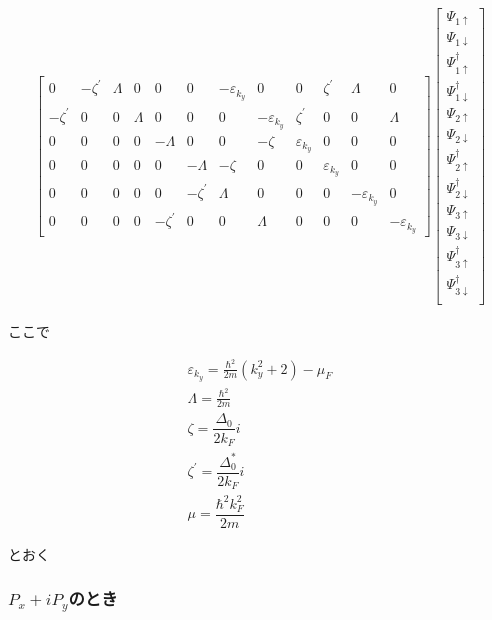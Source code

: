 \documentclass{jsarticle}
\begin{document}
\begin{align}
\begin{bmatrix}
			    	0 & -\zeta^{'} & \varLambda & 0 & 0 & 0 & -\varepsilon_{k_y} & 0 & 0 & \zeta^{'} & \varLambda & 0 \\
			    	-\zeta^{'} & 0 & 0 & \varLambda & 0 & 0 & 0 & -\varepsilon_{k_y} & \zeta^{'} & 0 & 0 & \varLambda \\
			    	0 & 0 & 0 & 0 & -\varLambda & 0 & 0 & -\zeta & \varepsilon_{k_y} & 0 & 0 & 0 \\
			    	0 & 0 & 0 & 0 & 0 & -\varLambda & -\zeta & 0 & 0 & \varepsilon_{k_y} & 0 & 0 \\
			    	0 & 0 & 0 & 0 & 0 & -\zeta^{'} & \varLambda & 0 & 0 & 0 & -\varepsilon_{k_y} & 0 \\
			    	0 & 0 & 0 & 0 & -\zeta^{'} & 0 & 0 & \varLambda & 0 & 0 & 0 & -\varepsilon_{k_y}
			    \end{bmatrix}
			    \begin{bmatrix}
			    	\Psi_{1\uparrow} \\
			    	\Psi_{1\downarrow} \\
			    	\Psi_{1\uparrow}^\dagger \\
			    	\Psi_{1\downarrow}^\dagger \\
			    	\Psi_{2\uparrow} \\
			    	\Psi_{2\downarrow} \\
			    	\Psi_{2\uparrow}^\dagger \\
			    	\Psi_{2\downarrow}^\dagger \\
			    	\Psi_{3\uparrow} \\
			    	\Psi_{3\downarrow} \\
			    	\Psi_{3\uparrow}^\dagger \\
			    	\Psi_{3\downarrow}^\dagger \\
			    \end{bmatrix}
		    \end{align}

		    ここで

		    \begin{align}
		    	\varepsilon_{k_y}=\frac{\hbar^2}{2m}(k_y^2+2)-\mu_F \\
		    	\varLambda=\frac{\hbar^2}{2m}\\
		    	\zeta=\dfrac{\Delta_0}{2k_{F}}i\\
		    	\zeta^{'}=\dfrac{\Delta_0^{*}}{2k_{F}}i\\
		    	\mu=\dfrac{\hbar^{2}k_F^{2}}{2m}
		    \end{align}

		    とおく

            \subsubsection{$P_x+iP_y$のとき}
\end{document}

